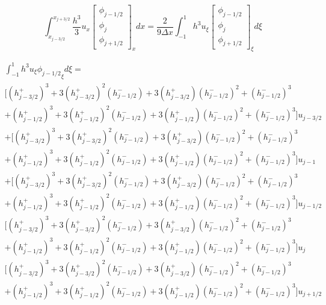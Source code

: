\documentclass[12pt]{article}
\begin{document}
\[\int_{x_{j-3/2}}^{x_{j+3/2}}\frac{h^3}{3}u_{x}\left[\begin{array}{c}\phi_{j-1/2} \\\phi_{j}\\\phi_{j+1/2} \end{array}\right]_xdx = \frac{2}{9 \Delta x}\int_{-1}^{1}h^3u_{\xi}\left[\begin{array}{c}\phi_{j-1/2} \\\phi_{j}\\\phi_{j+1/2} \end{array}\right]_\xi d\xi\]

\begin{multline*}
\int_{-1}^{1}h^3u_{\xi}{\phi_{j-1/2}}_\xi d\xi  = \\
\bigg[\left(h^+_{j - 3/2}\right)^3 + 3 \left(h^+_{j - 3/2}\right)^2 \left(h^-_{j - 1/2}\right)
+ 3 \left(h^+_{j - 3/2}\right) \left(h^-_{j - 1/2}\right)^2 +  \left(h^-_{j - 1/2}\right)^3 \\ + \left(h^+_{j - 1/2} \right)^3 + 3 \left(h^+_{j - 1/2} \right)^2\left(h^-_{j - 1/2}\right) + 3 \left(h^+_{j - 1/2} \right)\left(h^-_{j - 1/2}\right)^2 + \left(h^-_{j - 1/2}\right)^3 \bigg] u_{j - 3/2} \\
+ \bigg[\left(h^+_{j - 3/2}\right)^3 + 3 \left(h^+_{j - 3/2}\right)^2 \left(h^-_{j - 1/2}\right)
+ 3 \left(h^+_{j - 3/2}\right) \left(h^-_{j - 1/2}\right)^2 +  \left(h^-_{j - 1/2}\right)^3 \\ + \left(h^+_{j - 1/2} \right)^3 + 3 \left(h^+_{j - 1/2} \right)^2\left(h^-_{j - 1/2}\right) + 3 \left(h^+_{j - 1/2} \right)\left(h^-_{j - 1/2}\right)^2 + \left(h^-_{j - 1/2}\right)^3 \bigg] u_{j - 1} \\
+ \bigg[\left(h^+_{j - 3/2}\right)^3 + 3 \left(h^+_{j - 3/2}\right)^2 \left(h^-_{j - 1/2}\right)
+ 3 \left(h^+_{j - 3/2}\right) \left(h^-_{j - 1/2}\right)^2 +  \left(h^-_{j - 1/2}\right)^3 \\ + \left(h^+_{j - 1/2} \right)^3 + 3 \left(h^+_{j - 1/2} \right)^2\left(h^-_{j - 1/2}\right) + 3 \left(h^+_{j - 1/2} \right)\left(h^-_{j - 1/2}\right)^2 + \left(h^-_{j - 1/2}\right)^3 \bigg] u_{j - 1/2} \\
\bigg[\left(h^+_{j - 3/2}\right)^3 + 3 \left(h^+_{j - 3/2}\right)^2 \left(h^-_{j - 1/2}\right)
+ 3 \left(h^+_{j - 3/2}\right) \left(h^-_{j - 1/2}\right)^2 +  \left(h^-_{j - 1/2}\right)^3 \\ + \left(h^+_{j - 1/2} \right)^3 + 3 \left(h^+_{j - 1/2} \right)^2\left(h^-_{j - 1/2}\right) + 3 \left(h^+_{j - 1/2} \right)\left(h^-_{j - 1/2}\right)^2 + \left(h^-_{j - 1/2}\right)^3 \bigg] u_{j}\\
\bigg[\left(h^+_{j - 3/2}\right)^3 + 3 \left(h^+_{j - 3/2}\right)^2 \left(h^-_{j - 1/2}\right)
+ 3 \left(h^+_{j - 3/2}\right) \left(h^-_{j - 1/2}\right)^2 +  \left(h^-_{j - 1/2}\right)^3 \\ + \left(h^+_{j - 1/2} \right)^3 + 3 \left(h^+_{j - 1/2} \right)^2\left(h^-_{j - 1/2}\right) + 3 \left(h^+_{j - 1/2} \right)\left(h^-_{j - 1/2}\right)^2 + \left(h^-_{j - 1/2}\right)^3 \bigg] u_{j + 1/2}
\end{multline*}
\end{document}
